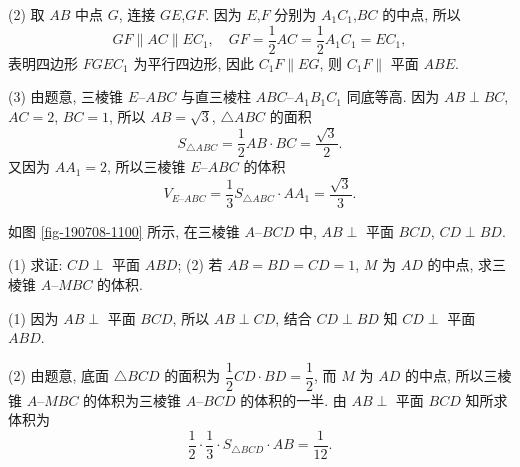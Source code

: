     (2) 取 $AB$ 中点 $G$, 连接 $GE$,$GF$. 因为 $E$,$F$ 分别为 $A_1 C_1$,$BC$ 的中点, 所以
    \[GF\parallel AC\parallel EC_1,\quad
        GF= \frac12 AC= \frac12 A_1C_1= EC_1,\]
    表明四边形 $FGEC_1$ 为平行四边形, 因此 $C_1F\parallel EG$, 则 $C_1 F\parallel $ 平面 $ABE$.

    (3) 由题意, 三棱锥 $E\text{--}ABC$ 与直三棱柱 $ABC\text{--}A_1 B_1 C_1$ 同底等高. 因为 $AB\perp BC$, $AC=2$, $BC=1$, 所以 $AB=\sqrt3$, $\triangle ABC$ 的面积
    \[S_{\triangle ABC}= \frac12 AB\cdot BC= \frac{\sqrt3}2.\]
    又因为 $AA_1= 2$, 所以三棱锥 $E\text{--}ABC$ 的体积
    \[V_{E\text{--}ABC}= \frac13 S_{\triangle ABC}\cdot AA_1
        = \frac{\sqrt3}3.\]
\endsolution
    
\lianxi
\begin{exercise}[s]
    如图 \ref{fig-190708-1100} 所示, 在三棱锥 $A\text{--}BCD$ 中, $AB\perp$ 平面 $BCD$, $CD\perp BD$.
    
    (1) 求证: $CD\perp$ 平面 $ABD$;\qquad
    (2) 若 $AB=BD=CD=1$, $M$ 为 $AD$ 的中点, 求三棱锥 $A\text{--}MBC$ 的体积.
\end{exercise}
\beginsolution
    (1) 因为 $AB\perp$ 平面 $BCD$, 所以 $AB\perp CD$, 结合 $CD\perp BD$ 知 $CD\perp$ 平面 $ABD$.

    (2) 由题意, 底面 $\triangle BCD$ 的面积为 $\dfrac12 CD\cdot BD= \dfrac12$, 而 $M$ 为 $AD$ 的中点, 所以三棱锥 $A\text{--}MBC$ 的体积为三棱锥 $A\text{--}BCD$ 的体积的一半. 由 $AB\perp$ 平面 $BCD$ 知所求体积为
    \[\frac12\cdot \frac13\cdot S_{\triangle BCD}\cdot AB
        = \frac1{12}.\]
\endsolution


